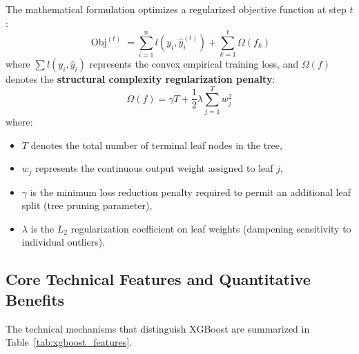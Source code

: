 The mathematical formulation optimizes a regularized objective function at step $t$:
\begin{equation}
    \operatorname{Obj}^{(t)} = \sum_{i=1}^n l(y_i, \hat{y}_i^{(t)}) + \sum_{k=1}^t \Omega(f_k)
\end{equation}
where $\sum l(y_i, \hat{y}_i)$ represents the convex empirical training loss, and $\Omega(f)$ denotes the \textbf{structural complexity regularization penalty}:
\begin{equation}
    \Omega(f) = \gamma T + \frac{1}{2} \lambda \sum_{j=1}^T w_j^2
\end{equation}
where:
\begin{itemize}
    \item $T$ denotes the total number of terminal leaf nodes in the tree,
    \item $w_j$ represents the continuous output weight assigned to leaf $j$,
    \item $\gamma$ is the minimum loss reduction penalty required to permit an additional leaf split (tree pruning parameter),
    \item $\lambda$ is the $L_2$ regularization coefficient on leaf weights (dampening sensitivity to individual outliers).
\end{itemize}

\subsection{Core Technical Features and Quantitative Benefits}
The technical mechanisms that distinguish XGBoost are summarized in Table~\ref{tab:xgboost_features}.

